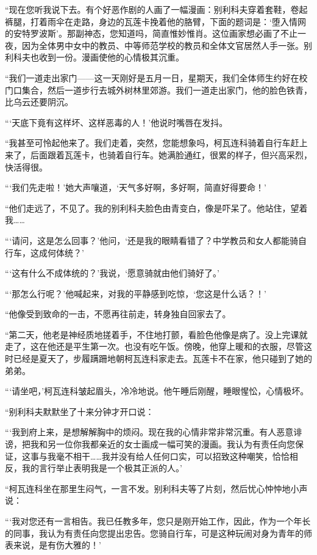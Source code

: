 \documentclass[12pt,UTF-8,openany]{ctexbook}
\begin{document}
\begin{large}
    “现在您听我说下去。有个好恶作剧的人画了一幅漫画：别利科夫穿着套鞋，卷起裤腿，打着雨伞在走路，身边的瓦莲卡挽着他的胳臂，下面的题词是：‘堕入情网的安特罗波斯’。那副神态，您知道吗，简直惟妙惟肖。这位画家想必画了不止一夜，因为全体男中女中的教员、中等师范学校的教员和全体文官居然人手一张。别利科夫也收到一份。漫画使他的心情极其沉重。
    
    “我们一道走出家门——这一天刚好是五月一日，星期天，我们全体师生约好在校门口集合，然后一道步行去城外树林里郊游。我们一道走出家门，他的脸色铁青，比乌云还要阴沉。
    
    “‘天底下竟有这样坏、这样恶毒的人！’他说时嘴唇在发抖。
    
    “我甚至可怜起他来了。我们走着，突然，您能想象吗，柯瓦连科骑着自行车赶上来了，后面跟着瓦莲卡，也骑着自行车。她满脸通红，很累的样子，但兴高采烈，快活得很。
    
    “‘我们先走啦！’她大声嚷道，‘天气多好啊，多好啊，简直好得要命！’
    
    “他们走远了，不见了。我的别利科夫脸色由青变白，像是吓呆了。他站住，望着我……
    
    “‘请问，这是怎么回事？’他问，‘还是我的眼睛看错了？中学教员和女人都能骑自行车，这成何体统？’
    
    “‘这有什么不成体统的？’我说，‘愿意骑就由他们骑好了。’
    
    “‘那怎么行呢？’他喊起来，对我的平静感到吃惊，‘您这是什么话？！’
    
    “他像受到致命的一击，不愿再往前走，转身独自回家去了。
    
    “第二天，他老是神经质地搓着手，不住地打颤，看脸色他像是病了。没上完课就走了，这在他还是平生第一次。也没有吃午饭。傍晚，他穿上暖和的衣服，尽管这时已经是夏天了，步履蹒跚地朝柯瓦连科家走去。瓦莲卡不在家，他只碰到了她的弟弟。
    
    “‘请坐吧，’柯瓦连科皱起眉头，冷冷地说。他午睡后刚醒，睡眼惺忪，心情极坏。
    
    “别利科夫默默坐了十来分钟才开口说：
    
    “‘我到府上来，是想解解胸中的烦闷。现在我的心情非常非常沉重。有人恶意诽谤，把我和另一位你我都亲近的女士画成一幅可笑的漫画。我认为有责任向您保证，这事与我毫不相干……我并没有给人任何口实，可以招致这种嘲笑，恰恰相反，我的言行举止表明我是一个极其正派的人。’
    
    “柯瓦连科坐在那里生闷气，一言不发。别利科夫等了片刻，然后忧心忡忡地小声说：
    
    “‘我对您还有一言相告。我已任教多年，您只是刚开始工作，因此，作为一个年长的同事，我认为有责任向您提出忠告。您骑自行车，可是这种玩闹对身为青年的师表来说，是有伤大雅的！’
    

\end{large}
\end{document}
